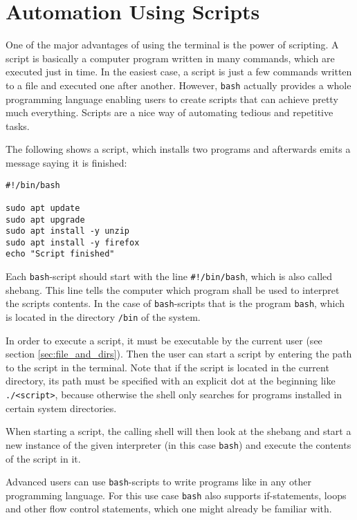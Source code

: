 \section{Automation Using Scripts}
\label{sec:scripting}

One of the major advantages of using the terminal is the power of scripting. A script is basically a computer program written in many commands, which are executed just in time. In the easiest case, a script is just a few commands written to a file and executed one after another. However, \lstinline{bash} actually provides a whole programming language enabling users to create scripts that can achieve pretty much everything. Scripts are a nice way of automating tedious and repetitive tasks.

The following shows a script, which installs two programs and afterwards emits a message saying it is finished:

\begin{lstlisting}
#!/bin/bash

sudo apt update
sudo apt upgrade
sudo apt install -y unzip
sudo apt install -y firefox
echo "Script finished"
\end{lstlisting}

Each \lstinline{bash}-script should start with the line \lstinline{#!/bin/bash}, which is also called shebang. This line tells the computer which program shall be used to interpret the scripts contents. In the case of \lstinline{bash}-scripts that is the program \lstinline{bash}, which is located in the directory \lstinline{/bin} of the system.

In order to execute a script, it must be executable by the current user (see section \ref{sec:file_and_dirs}). Then the user can start a script by entering the path to the script in the terminal. Note that if the script is located in the current directory, its path must be specified with an explicit dot at the beginning like \lstinline{./<script>}, because otherwise the shell only searches for programs installed in certain system directories.

When starting a script, the calling shell will then look at the shebang and start a new instance of the given interpreter (in this case \lstinline{bash}) and execute the contents of the script in it.

Advanced users can use \lstinline{bash}-scripts to write programs like in any other programming language. For this use case \lstinline{bash} also supports if-statements, loops and other flow control statements, which one might already be familiar with.